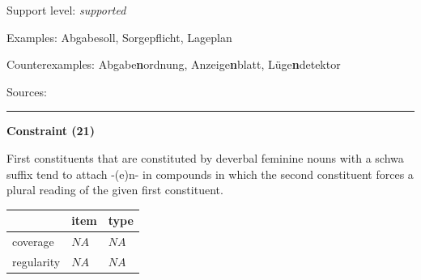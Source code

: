 \vspace{-1.35em}

\noindent
Support level: \textit{supported}

\vspace{0.3em}

\noindent
Examples: Abgabe{\zeroLinker}soll, Sorge{\zeroLinker}pflicht, Lage{\zeroLinker}plan

\noindent
Counterexamples: Abgabe\textbf{n}ordnung, Anzeige\textbf{n}blatt, Lüge\textbf{n}detektor

\vspace{0.3em}

\noindent
Sources: \citet[93]{ortner_müller-bollhagen_1991}

\vspace{0.35em}
\hrule




\vspace{0.4em}

\begin{center}
\textbf{Constraint (21)}
\end{center}

\noindent
First constituents that are constituted by deverbal feminine nouns with a schwa suffix tend to attach -(e)n- in compounds in which the second constituent forces a plural reading of the given first constituent.
\vspace{0.5em}


\vspace{-0.25em}

\begin{table}[!ht]
\begin{center}
\setlength{\extrarowheight}{1pt}
\begin{tabularx}{\columnwidth}{|X|X|X|}
\hline
 & item & type \\
\hline
 coverage & $NA$ & $NA$ \\
\hline
 regularity & $NA$ & $NA$ \\
\hline
\end{tabularx}
\end{center}
\end{table}

